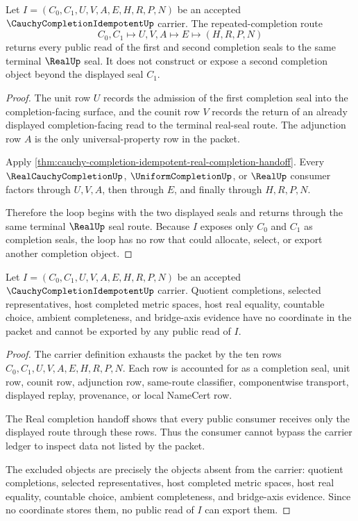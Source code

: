 \begin{theorem}
\label{thm:cauchy-completion-idempotent-unit-counit-loop}
Let $I=(C_0,C_1,U,V,A,E,H,R,P,N)$ be an accepted $\CauchyCompletionIdempotentUp$ carrier. The repeated-completion route
$$
C_0,C_1\longmapsto U,V,A\longmapsto E\longmapsto(H,R,P,N)
$$
returns every public read of the first and second completion seals to the same terminal $\RealUp$ seal. It does not construct or expose a second completion object beyond the displayed seal $C_1$.
\end{theorem}
\begin{proof}
The unit row $U$ records the admission of the first completion seal into the completion-facing surface, and the counit row $V$ records the return of an already displayed completion-facing read to the terminal real-seal route. The adjunction row $A$ is the only universal-property row in the packet.

Apply \autoref{thm:cauchy-completion-idempotent-real-completion-handoff}. Every $\RealCauchyCompletionUp$, $\UniformCompletionUp$, or $\RealUp$ consumer factors through $U,V,A$, then through $E$, and finally through $H,R,P,N$.

Therefore the loop begins with the two displayed seals and returns through the same terminal $\RealUp$ seal route. Because $I$ exposes only $C_0$ and $C_1$ as completion seals, the loop has no row that could allocate, select, or export another completion object.
\end{proof}

\begin{theorem}
\label{thm:cauchy-completion-idempotent-ledger-nonescape}
Let $I=(C_0,C_1,U,V,A,E,H,R,P,N)$ be an accepted $\CauchyCompletionIdempotentUp$ carrier. Quotient completions, selected representatives, host completed metric spaces, host real equality, countable choice, ambient completeness, and bridge-axis evidence have no coordinate in the packet and cannot be exported by any public read of $I$.
\end{theorem}
\begin{proof}
The carrier definition exhausts the packet by the ten rows $C_0,C_1,U,V,A,E,H,R,P,N$. Each row is accounted for as a completion seal, unit row, counit row, adjunction row, same-route classifier, componentwise transport, displayed replay, provenance, or local NameCert row.

The Real completion handoff shows that every public consumer receives only the displayed route through these rows. Thus the consumer cannot bypass the carrier ledger to inspect data not listed by the packet.

The excluded objects are precisely the objects absent from the carrier: quotient completions, selected representatives, host completed metric spaces, host real equality, countable choice, ambient completeness, and bridge-axis evidence. Since no coordinate stores them, no public read of $I$ can export them.
\end{proof}

